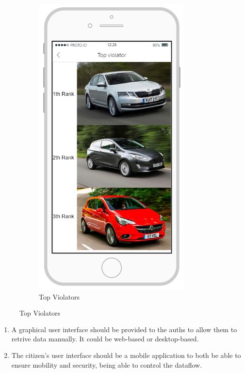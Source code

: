 \documentclass{article}
\newcommand{\enum}[1]{\texttt{#1.\arabic*}}
\begin{document}
\begin{figure}[H]
\begin{subfigure}[H]{0.25\linewidth}
					\includegraphics[width=\linewidth]{Images/Top_Violators.png}
					\caption{Top Violators}
				\end{subfigure}
			\end{figure}				
			\newpage	
		
			\begin{enumerate}[label=\enum{UI}]
				\item \label{UI:authority}A graphical user interface should be provided to the auths to allow them to retrive data manually. It could be web-based or desktop-based.
				\item \label{UI:citizen}The citizen's user interface should be a mobile application to both be able to ensure mobility and security, being able to control the dataflow.
			\end{enumerate}
			
\end{document}
